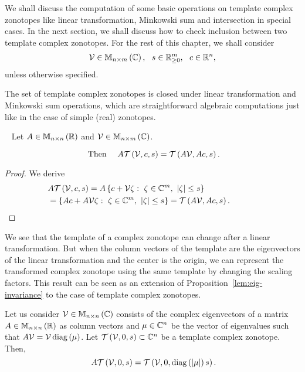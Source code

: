 We shall discuss the computation of some basic operations on template complex zonotopes
like linear transformation, Minkowski sum and intersection in special
cases.  In the next section, we shall discuss how to check inclusion
between two template complex zonotopes.  For the rest of this chapter,
we shall consider
%
\begin{align*}
\mathcal{V}\in\mathbb{M}_{n\times m}\left(\mathbb{C}\right),~~s\in\mathbb{R}^m_{\geq 0},~~c\in\mathbb{R}^n,
\end{align*}
%
unless otherwise specified.

The set of template complex zonotopes is closed under linear transformation and
{Minkowski sum} operations, which are straightforward algebraic
computations just like in the case of simple (real) zonotopes.
%
\begin{lemma}~\label{lem:lin-transform}
Let $A\in\mathbb{M}_{n\times n}\left(\mathbb{R}\right)$ and $\mathcal{V}\in\mathbb{M}_{n\times m}\left(\mathbb{C}\right)$.

%
\begin{equation*}~\label{eqn:lin-transform}
\text{Then}~~~~A\mathit{\operatorname{\mathcal{T}}}\left(\mathcal{V},c,s\right)=\mathit{\operatorname{\mathcal{T}}}\left(A\mathcal{V},Ac,s\right).
\end{equation*}
%
\end{lemma}
%
\begin{proof}
  We derive
  \begin{align*}
&
    A\mathit{\operatorname{\mathcal{T}}}\left(\mathcal{V},c,s\right)=A\left\{c+\mathcal{V}\zeta:~\zeta\in\mathbb{C}^m,~\left|\zeta\right|\leq
    s\right\}\\
    & =\left\{Ac+A\mathcal{V}\zeta:~\zeta\in\mathbb{C}^m,~\left|\zeta\right|\leq
    s\right\}=\mathit{\operatorname{\mathcal{T}}}\left(A\mathcal{V},Ac,s\right).~\hspace{3em}\qedhere
  \end{align*}
\end{proof}
%
We see that the template of a complex zonotope can change after a
linear transformation.  But when the column vectors of the
template are the eigenvectors of the linear transformation and the
center is the origin, we can represent the transformed complex
zonotope using the same template by changing the scaling factors.
This result can be seen as an extension of Proposition~\ref{lem:eig-invariance} to the
case of template complex zonotopes.
%
\begin{proposition}
Let us consider $\mathcal{V}\in\mathbb{M}_{n\times n}\left(\mathbb{C}\right)$ consists of the complex
eigenvectors of a matrix $A\in\mathbb{M}_{n\times n}\left(\mathbb{R}\right)$ as column vectors
and $\mu\in\mathbb{C}^n$ be the vector of eigenvalues such that
$A\mathcal{V}=\mathcal{V}\operatorname{diag}\left(\mu\right)$.  Let
$\mathit{\operatorname{\mathcal{T}}}\left(\mathcal{V},0,s\right)\subset\mathbb{C}^n$ be a template complex
zonotope.  Then,
%
\begin{equation}~\label{eqn:eigen-scaling}
A\mathit{\operatorname{\mathcal{T}}}\left(\mathcal{V},0,s\right)=\mathit{\operatorname{\mathcal{T}}}\left(\mathcal{V},0,\operatorname{diag}\left(\left|\mu\right|\right)s\right).
\end{equation}
%
\end{proposition}
